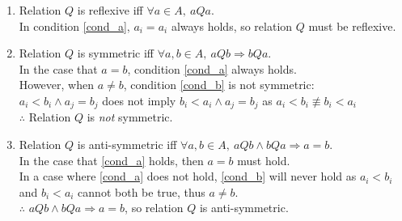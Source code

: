 \documentclass[12pt]{article}
\begin{document}
\begin{enumerate}[label = \textbf{(\roman*)}]
	\item
		Relation $Q$ is reflexive iff $\forall a \in A,\ aQa$.\\
		In condition \ref{cond_a}, $a_i = a_i$ always holds, so relation $Q$ must be reflexive.

	\item
		Relation $Q$ is symmetric iff $\forall a,b \in A,\ aQb \Rightarrow bQa$.\\
		In the case that $a = b$, condition \ref{cond_a} always holds.\\
		However, when $a \neq b$, condition \ref{cond_b} is not symmetric:\\
		$a_i < b_i \land a_j = b_j$ does not imply $b_i < a_i \land a_j = b_j$ as $a_i < b_i \not\equiv b_i < a_i$\\
		$\therefore$ Relation $Q$ is \textit{not} symmetric.

	\item
		Relation $Q$ is anti-symmetric iff $\forall a,b \in A,\ aQb \land bQa \Rightarrow a = b$.\\
		In the case that \ref{cond_a} holds, then $a = b$ must hold.\\
		In a case where \ref{cond_a} does not hold, \ref{cond_b} will never hold as
		$a_i < b_i$ and $b_i < a_i$ cannot both be true, thus $a \neq b$.\\
		$\therefore$ $aQb \land bQa \Rightarrow a = b$, so relation $Q$ is anti-symmetric.


\end{enumerate}
\end{document}
